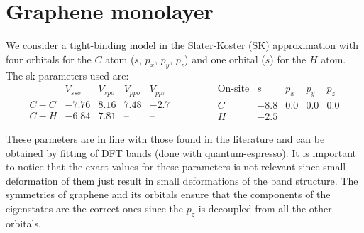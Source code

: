 \chapter{Graphene monolayer}
We consider a tight-binding model in the Slater-Koster (SK) approximation with four orbitals for the $C$ atom ($s$, $p_x$, $p_y$, $p_z$) and one orbital ($s$) for the $H$ atom. The \ac{sk} parameters used are:
\begin{equation}
  \begin{array}{l|cccc}
        & V_{ss\sigma} & V_{sp\sigma} & V_{pp\sigma} & V_{pp\pi} \\ \hline
    C-C & -7.76 & 8.16 & 7.48 & -2.7 \\
    C-H & -6.84 & 7.81 & \text{--} & \text{--}
  \end{array}\qquad\qquad
  \begin{array}{c|cccc}
    \text{On-site} & s & p_x & p_y & p_z \\ \hline
    C & -8.8 & 0.0 & 0.0 & 0.0 \\
    H & -2.5 &     &     &
  \end{array}
\label{SK_params}
\end{equation}

These parmeters are in line with those found in the literature\cite{Gosalbez-Martinez2011,Konschuh2010,Saito1998} and can be obtained by fitting of DFT bands (done with quantum-espresso). It is important to notice that the exact values for these parameters is not relevant since small deformation of them just result in small deformations of the band structure. The symmetries of graphene and its orbitals ensure that the components of the eigenstates are the correct ones since the $p_z$ is decoupled from all the other orbitals.


